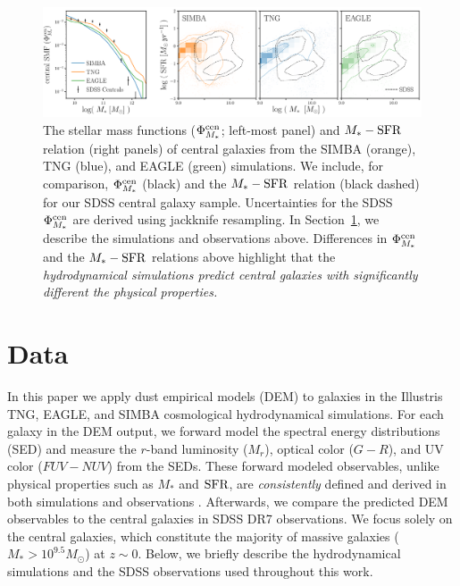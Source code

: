 \begin{figure}
\begin{center}
    \includegraphics[width=\textwidth]{figs/smf_m_sfr.pdf}
    \caption{\label{fig:smf_msfr}
    The stellar mass functions ($\Phi^{\rm cen}_{M_*}$; left-most panel) and
    $M_*-{\rm SFR}$ relation (right panels)  of central galaxies from the SIMBA
    (orange), TNG (blue), and EAGLE (green) simulations. We include, for
    comparison, $\Phi^{\rm cen}_{M_*}$ (black) and the $M_*-{\rm SFR}$ relation
    (black dashed) for our SDSS central galaxy sample. Uncertainties for 
    the SDSS $\Phi^{\rm cen}_{M_*}$ are derived using jackknife resampling. 
    In Section~\ref{sec:sims}, we describe the simulations and observations 
    above. Differences in $\Phi^{\rm cen}_{M_*}$ and the $M_*-{\rm SFR}$ relations 
    above highlight that the \emph{hydrodynamical simulations predict central 
    galaxies with significantly different the physical properties.} 
    }
\end{center}
\end{figure}

\section{Data}\label{sec:sims}
In this paper we apply dust empirical models (DEM) to galaxies in the Illustris
TNG, EAGLE, and SIMBA cosmological hydrodynamical simulations. For each galaxy
in the DEM output, we forward model the spectral energy distributions (SED) and
measure the $r$-band luminosity ($M_r$), optical color ($G-R$), and UV color
($FUV-NUV$) from the SEDs. These forward modeled observables, unlike physical
properties such as $M_*$ and ${\rm SFR}$, are \emph{consistently} defined and
derived in both simulations and observations .  Afterwards, we compare the
predicted DEM observables to the central galaxies in SDSS DR7 observations.  
We focus solely on the central galaxies, which constitute the majority of
massive galaxies ($M_* > 10^{9.5}M_\odot$) at $z\sim0$.   Below, we briefly describe
the hydrodynamical simulations and the SDSS observations used throughout this
work.

